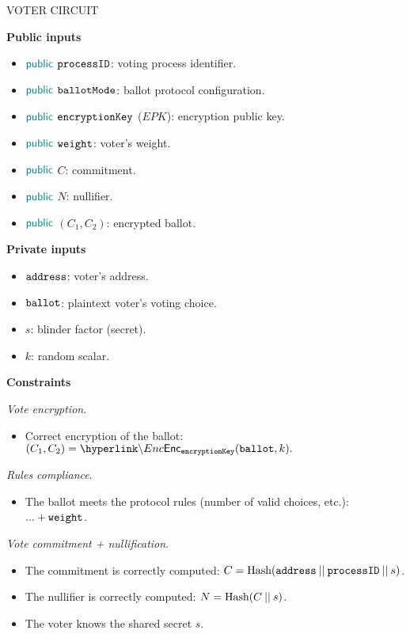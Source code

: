 \begin{mdframed}
	\begin{minipage}[H]{1\textwidth}
		\begin{spacing}{1.25}
			\vspace{0.3cm}
			\begin{center}{VOTER CIRCUIT}\end{center}
			\textbf{Public inputs}
				\begin{itemize}
					\item ${\sf\color{teal}public}$ $\texttt{processID}$: voting process identifier. 
					\item ${\sf\color{teal}public}$ $\texttt{ballotMode}$: ballot protocol configuration.
					\item ${\sf\color{teal}public}$ $\texttt{encryptionKey}$ ($EPK$): encryption public key.
					\item ${\sf\color{teal}public}$ $\texttt{weight}$: voter's weight.
					\item ${\sf\color{teal}public}$ $C$: commitment.
					\item ${\sf\color{teal}public}$ $N$: nullifier.
					\item ${\sf\color{teal}public}$ $(C_1, C_2)$: encrypted ballot. 
				\end{itemize}
			\textbf{Private inputs}
				\begin{itemize}								
					\item \private $\texttt{address}$: voter's address.
					\item \private $\texttt{ballot}$: plaintext voter's voting choice.
					\item \private $s$: blinder factor (secret).
					\item \private $k$: random scalar.
				\end{itemize}
			\textbf{Constraints} \\ \vspace{-0.4cm}		
				
				\emph{Vote encryption}. 
				\begin{itemize}								
					\item Correct encryption of the ballot: $(C_1, C_2) = \hlget{\Enc}_{\epk}(\ballot, k).$
				\end{itemize}
				\emph{Rules compliance}. 
				\begin{itemize}								
					\item The ballot meets the protocol rules (number of valid choices, etc.): $... + \texttt{weight}$.
				\end{itemize}
				\emph{Vote commitment + nullification}. 
				\begin{itemize}								
					\item The commitment is correctly computed: $C = \text{Hash} (\texttt{address} \:||\: \texttt{processID} \:||\: s)$.
					\item The nullifier is correctly computed: $N = \text{Hash}(C \:||\: s)$.
					\item The voter knows the shared secret $s$.
				\end{itemize}
				\vspace{-0.3cm}
		\end{spacing}
	\end{minipage}
\end{mdframed}

